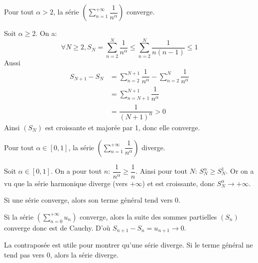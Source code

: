 \documentclass[a4paper, 12pt]{article}
\begin{document}
\begin{proposition}{}{}
    Pour tout $\alpha \gt 2$, la série $(\sum\limits_{n=1}^{+\infty}\dfrac{1}{n^\alpha})$ converge.
\end{proposition}

\begin{demonstration}
    Soit $\alpha \geq 2$.\n
    On a:
    $$
    \forall N \geq 2, S_N = \sum\limits_{n=2}^{N}\dfrac{1}{n^\alpha} \leq \sum\limits_{n=2}^{N}\dfrac{1}{n(n-1)} \leq 1
    $$
    Aussi
    \begin{align*}
    S_{N+1} - S_N &= \sum\limits_{n=2}^{N+1}\dfrac{1}{n^\alpha} - \sum\limits_{n=2}^{N}\dfrac{1}{n^\alpha}\\
    &= \sum\limits_{n=N+1}^{N+1}\dfrac{1}{n^\alpha}\\
    &= \dfrac{1}{(N+1)^\alpha} \gt 0
    \end{align*}
    Ainsi $(S_N)$ est croissante et majorée par 1, donc elle converge.
\end{demonstration}

\begin{proposition}{}{}
    Pour tout $\alpha \in [0, 1]$, la série $(\sum\limits_{n=1}^{+\infty}\dfrac{1}{n^\alpha})$ diverge.
\end{proposition}

\begin{demonstration}
    Soit $\alpha \in [0, 1]$.\n
    On a pour tout $n$: $\dfrac{1}{n^\alpha} \geq \dfrac{1}{n}$.\n
    Ainsi pour tout $N$: $S_N^\alpha \geq S_N^1$.\n
    Or on a vu que la série harmonique diverge (vers $+\infty$) et est croissante, donc $S_N^\alpha \rightarrow +\infty$.\n
\end{demonstration}

\begin{proposition}{}{}
    Si une série converge, alors son terme général tend vers 0.
\end{proposition}

\begin{demonstration}
    Si la série $\left( \sum\limits_{n=0}^{+\infty} u_n \right)$ converge,
    alors la suite des sommes partielles $(S_n)$ converge donc est de Cauchy.\n
    D'où $S_{n+1} - S_n = u_{n+1} \rightarrow 0$.
\end{demonstration}

\begin{remarque}
    La contraposée est utile pour montrer qu'une série diverge.\n
    Si le terme général ne tend pas vers 0, alors la série diverge.
\end{remarque}
\end{document}
